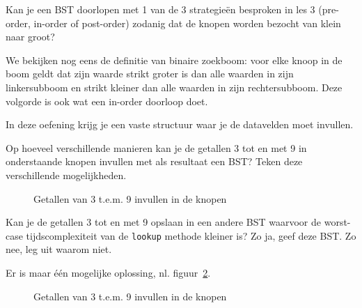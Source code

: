 \newpage
\begin{oef}
\papier Kan je een BST doorlopen met 1 van de 3 strategie\"en besproken in les 3 (pre-order, in-order of post-order) zodanig dat de knopen worden bezocht van klein naar groot?
\begin{opl}
We bekijken nog eens de definitie van binaire zoekboom: voor elke knoop in de boom geldt dat zijn waarde strikt groter is dan alle waarden in zijn linkersubboom en strikt kleiner dan alle waarden in zijn rechtersubboom. Deze volgorde is ook wat een in-order doorloop doet.
\end{opl}
\end{oef}





\begin{oef}
\papier In deze oefening krijg je een vaste structuur waar je de datavelden moet invullen.
\begin{oefenumerate}
\item Op hoeveel verschillende manieren kan je de getallen 3 tot en met 9 in onderstaande knopen invullen met als resultaat een BST?  Teken deze verschillende mogelijkheden.
\begin{figure}[htbp]
    \centering
{}
\caption{Getallen van 3 t.e.m. 9 invullen in de knopen}
    \label{fig:oefBST39}
\end{figure}

\item Kan je de getallen 3 tot en met 9 opslaan in een andere BST waarvoor de worst-case tijdscomplexiteit van de \verb=lookup= methode kleiner is? Zo ja, geef deze BST. Zo nee, leg uit waarom niet.
\end{oefenumerate}


\begin{opl}
Er is maar één mogelijke oplossing, nl. figuur~\ref{fig:oefBST39opl}.
\begin{figure}[htbp]
    \centering
{}
\caption{Getallen van 3 t.e.m. 9 invullen in de knopen}
    \label{fig:oefBST39opl}
\end{figure}
\end{opl}
\end{oef}






